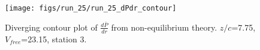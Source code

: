 \begin{figure}[H]
\centering
\texttt{[image: figs/run\_25/run\_25\_dPdr\_contour]}
\caption{Diverging contour plot of $\frac{d\bar{P}}{dr}$ from non-equilibrium theory. $z/c$=7.75, $V_{free}$=23.15, station 3.}
\label{fig:run_25_dPdr_contour}
\end{figure}


